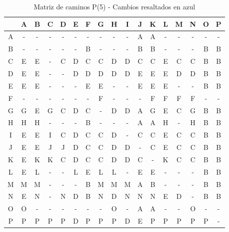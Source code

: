 \documentclass[12pt]{article}
\begin{document}
\begin{table}[h!]
\centering
\begin{tabular}{|c|c|c|c|c|c|c|c|c|c|c|c|c|c|c|c|c|}
\hline
 & A & B & C & D & E & F & G & H & I & J & K & L & M & N & O & P \\\hline
A & - & - & - & - & - & - & - & - & - & A & A & - & - & - & - & - \\\hline
B & - & - & - & - & - & B & - & - & - & B & B & - & - & - & B & B \\\hline
C & \cellcolor{lightblue} E & \cellcolor{lightblue} E & - & C & D & C & C & D & D & C & C & \cellcolor{lightblue} E & C & C & \cellcolor{lightblue} B & \cellcolor{lightblue} B \\\hline
D & \cellcolor{lightblue} E & \cellcolor{lightblue} E & - & - & D & D & D & D & D & \cellcolor{lightblue} E & \cellcolor{lightblue} E & \cellcolor{lightblue} E & D & D & \cellcolor{lightblue} B & \cellcolor{lightblue} B \\\hline
E & E & E & - & - & - & E & E & - & - & E & E & E & - & - & B & B \\\hline
F & - & - & - & - & - & - & F & - & - & - & F & F & F & F & - & - \\\hline
G & G & \cellcolor{lightblue} E & G & C & D & C & - & D & D & A & G & \cellcolor{lightblue} E & C & G & \cellcolor{lightblue} B & \cellcolor{lightblue} B \\\hline
H & H & H & - & - & - & B & - & - & - & A & A & H & - & H & B & B \\\hline
I & \cellcolor{lightblue} E & \cellcolor{lightblue} E & I & C & D & C & C & D & - & C & C & \cellcolor{lightblue} E & C & C & \cellcolor{lightblue} B & \cellcolor{lightblue} B \\\hline
J & \cellcolor{lightblue} E & \cellcolor{lightblue} E & J & J & D & C & C & D & D & - & C & \cellcolor{lightblue} E & C & C & \cellcolor{lightblue} B & \cellcolor{lightblue} B \\\hline
K & \cellcolor{lightblue} E & K & K & C & D & C & C & D & D & C & - & K & C & C & B & B \\\hline
L & \cellcolor{lightblue} E & L & - & - & L & \cellcolor{lightblue} E & L & L & - & \cellcolor{lightblue} E & \cellcolor{lightblue} E & - & - & - & B & B \\\hline
M & M & M & - & - & - & B & M & M & M & A & B & - & - & - & B & B \\\hline
N & \cellcolor{lightblue} E & N & - & N & D & B & N & D & N & N & N & \cellcolor{lightblue} E & D & - & B & B \\\hline
O & O & - & - & - & - & - & - & O & - & A & A & - & - & O & - & - \\\hline
P & P & P & P & P & D & P & P & P & D & \cellcolor{lightblue} E & P & P & P & P & P & - \\\hline
\end{tabular}
\caption{Matriz de caminos P(5) - Cambios resaltados en azul}
\end{table}
\end{document}
